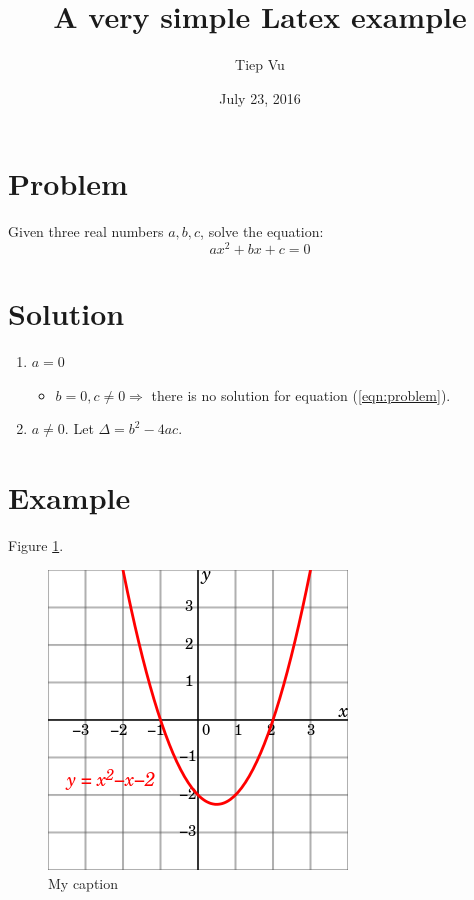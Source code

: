 \documentclass{article}
\title{A very simple Latex example}
\author{Tiep Vu}
\date{July 23, 2016}
\begin{document}
\maketitle

\section{Problem} %
\label{sec:problem}
Given three real numbers $a, b, c$, solve the equation: 
\begin{equation}
\label{eqn:problem}
    ax^{2} + bx + c = 0 
\end{equation}

\section{Solution} %
\label{sec:solution}

\begin{enumerate}
	\item $a = 0 $
	\begin{itemize}
		\item $b = 0, c \neq 0 \Rightarrow$ there is no solution for equation (\ref{eqn:problem}).
	\end{itemize}
	\item $a \neq 0 $. Let $\Delta = b^2 - 4ac.$
\end{enumerate}

\section{Example} %
\label{sec:example}
Figure \ref{fig:exampl1}.


\begin{figure}[h]
\label{fig:exampl1}
\centering
	\includegraphics[scale = 0.3]{figs/fig1.png}
	\caption{My caption}
\end{figure}

\end{document}
